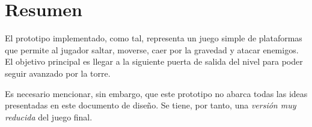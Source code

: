 \section{Resumen} %



El prototipo implementado, como tal, representa un juego simple de plataformas
que permite al jugador saltar, moverse, caer por la gravedad y atacar enemigos.
El objetivo principal es llegar a la siguiente puerta de salida del nivel para
poder seguir avanzado por la torre.

Es necesario mencionar, sin embargo, que este prototipo no abarca todas las
ideas presentadas en este documento de diseño. Se tiene, por tanto, una \emph{versión
muy reducida} del juego final.